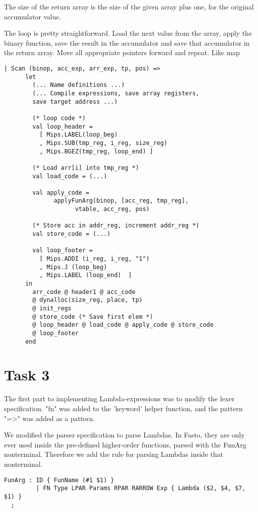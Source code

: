 \documentclass[10pt]{article}
\begin{document}
The size of the return array is the size of the given array plus one, for the original accumulator value.

The loop is pretty straightforward. Load the next value from the array, apply the binary function, save the result in the accumulator and save that accumulator in the return array. Move all appropriate pointers forward and repeat. Like map

\begin{Verbatim}[frame=single]
  | Scan (binop, acc_exp, arr_exp, tp, pos) =>
      let
        (... Name definitions ...)
        (... Compile expressions, save array registers, 
        save target address ...)

        (* loop code *)
        val loop_header =
          [ Mips.LABEL(loop_beg)
          , Mips.SUB(tmp_reg, i_reg, size_reg)
          , Mips.BGEZ(tmp_reg, loop_end) ]
  
        (* Load arr[i] into tmp_reg *)
        val load_code = (...)
  
        val apply_code =
              applyFunArg(binop, [acc_reg, tmp_reg], 
              		vtable, acc_reg, pos)
  
        (* Store acc in addr_reg, increment addr_reg *)
        val store_code = (...)
              
        val loop_footer =
          [ Mips.ADDI (i_reg, i_reg, "1")
          , Mips.J (loop_beg)
          , Mips.LABEL (loop_end)  ]
      in
        arr_code @ header1 @ acc_code
        @ dynalloc(size_reg, place, tp)
        @ init_regs
        @ store_code (* Save first elem *)
        @ loop_header @ load_code @ apply_code @ store_code 
        @ loop_footer
      end
\end{Verbatim}

\section{Task 3}
The first part to implementing Lambda-expressions was to modify the lexer specification. "fn" was added to the 'keyword' helper function, and the pattern "=>" was added as a pattern.

We modified the parser specification to parse Lambdas. In Fasto, they are only ever used inside the pre-defined higher-order functions, parsed with the FunArg nonterminal. Therefore we add the rule for parsing Lambdas inside that nonterminal.
\begin{Verbatim}[frame=single]
  FunArg : ID { FunName (#1 $1) }
         | FN Type LPAR Params RPAR RARROW Exp { Lambda ($2, $4, $7, $1) }
  ;
\end{Verbatim}
\end{document}
